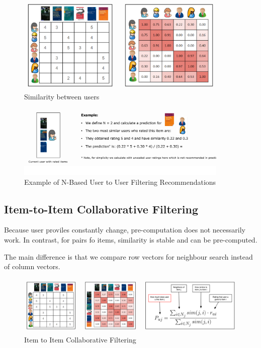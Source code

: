 \documentclass[11pt]{article}
\begin{document}
\begin{figure}[htb!]
    \centering
    \includegraphics[keepaspectratio=true, width=0.9\textwidth]{user_to_user_collaborative_filtering_v2.png}
    \caption{Similarity between users}
    \label{fig:user_similarity}
\end{figure}

\newpage

\begin{figure}[htb!]
    \centering
    \includegraphics[keepaspectratio=true, width=0.9\textwidth]{user_to_user_collaborative_filtering_v3.png}
    \caption{Example of N-Based User to User Filtering Recommendations}
    \label{fig:context_based_example}
\end{figure}


\subsection{Item-to-Item Collaborative Filtering}

Because user proviles constantly change, pre-computation does not necessarily work. In contrast, for pairs fo items, similarity is stable and can be pre-computed.

The main difference is that we compare row vectors for neighbour search instead of column vectors.

\begin{figure}[htb!]
    \centering
    \includegraphics[keepaspectratio=true, width=\linewidth]{item_to_item_collaborative_filtering.png}
    \caption{Item to Item Collaborative Filtering}
    \label{fig:item_to_item_collaborative_filtering}
\end{figure}
\end{document}

